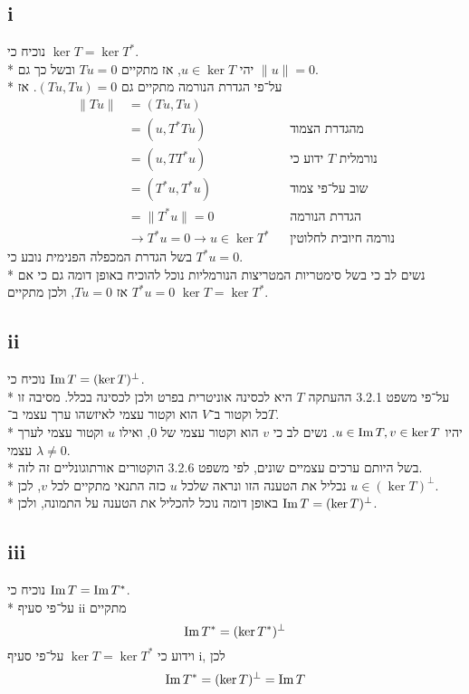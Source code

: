 \subsection{i}
נוכיח כי $\ker T = \ker T^*$. \\*
יהי $u \in \ker T$, אז מתקיים $T u = 0$ ובשל כך גם $\lVert u \rVert = 0$. \\*
על־פי הגדרת הנורמה מתקיים גם $(T u, T u) = 0$. אז
\begin{align*}
	\lVert T u \rVert & = (T u, T u) \\
					  & = (u, T^* T u) && \text{מהגדרת הצמוד} \\
					  & = (u, T T^* u) && \text{ידוע כי $T$ נורמלית} \\
					  & = (T^* u, T^* u) && \text{שוב על־פי צמוד} \\
					  & = \lVert T^* u \rVert = 0 && \text{הגדרת הנורמה} \\
					  & \rightarrow T^* u = 0 \rightarrow u \in \ker T^* && \text{נורמה חיובית לחלוטין}
\end{align*}
בשל הגדרת המכפלה הפנימית נובע כי $T^* u = 0$. \\*
נשים לב כי בשל סימטריות המטריצות הנורמליות נוכל להוכיח באופן דומה גם כי אם $T^* u = 0$ אז $T u = 0$,
ולכן מתקיים $\ker T = \ker T^*$.

\subsection{ii}
נוכיח כי $\operatorname{Im} T = (\ker T)^\perp$. \\*
על־פי משפט 3.2.1 ההעתקה $T$ היא לכסינה אוניטרית בפרט ולכן לכסינה בכלל.
מסיבה זו כל וקטור ב־$V$ הוא וקטור עצמי לאיזשהו ערך עצמי ב־$T$. \\*
יהיו $u \in \operatorname{Im} T, v \in \ker T$. נשים לב כי $v$ הוא וקטור עצמי של $0$, ואילו $u$ וקטור עצמי לערך עצמי $\lambda \ne 0$. \\*
בשל היותם ערכים עצמיים שונים, לפי משפט 3.2.6 הוקטורים אורתוגונליים זה לזה. \\*
נכליל את הטענה הזו ונראה שלכל $u$ כזה התנאי מתקיים לכל $v$, לכן $u \in (\ker T)^\perp$. \\*
באופן דומה נוכל להכליל את הטענה על התמונה, ולכן $\operatorname{Im} T = (\ker T)^\perp$.

\subsection{iii}
נוכיח כי $\operatorname{Im} T = \operatorname{Im} T^*$. \\*
על־פי סעיף ii מתקיים
\[
	\operatorname{Im} T^* = (\ker T^*)^\perp
\]
וידוע כי $\ker T = \ker T^*$ על־פי סעיף i, לכן
\[
	\operatorname{Im} T^* = (\ker T)^\perp = \operatorname{Im} T
\]

